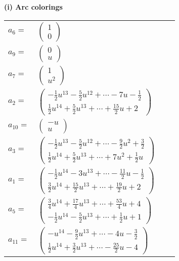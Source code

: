 \documentclass[1p]{elsarticle_modified}
\theoremstyle{definition}
\begin{document}
\flushleft \textbf{(i) Arc colorings}\\
\begin{tabular}{m{7pt} m{180pt} m{7pt} m{180pt} }
\flushright $a_{6}=$&$\begin{pmatrix}1\\0\end{pmatrix}$ \\
\flushright $a_{9}=$&$\begin{pmatrix}0\\u\end{pmatrix}$ \\
\flushright $a_{7}=$&$\begin{pmatrix}1\\u^2\end{pmatrix}$ \\
\flushright $a_{2}=$&$\begin{pmatrix}-\frac{1}{2} u^{13}-\frac{5}{2} u^{12}+\cdots-7 u-\frac{1}{2}\\\frac{1}{2} u^{14}+\frac{5}{2} u^{13}+\cdots+\frac{15}{2} u+2\end{pmatrix}$ \\
\flushright $a_{10}=$&$\begin{pmatrix}- u\\u\end{pmatrix}$ \\
\flushright $a_{3}=$&$\begin{pmatrix}-\frac{1}{2} u^{13}-\frac{5}{2} u^{12}+\cdots-\frac{9}{2} u^2+\frac{3}{2}\\\frac{1}{2} u^{14}+\frac{5}{2} u^{13}+\cdots+7 u^2+\frac{1}{2} u\end{pmatrix}$ \\
\flushright $a_{1}=$&$\begin{pmatrix}-\frac{1}{2} u^{14}-3 u^{13}+\cdots-\frac{11}{2} u-\frac{1}{2}\\\frac{3}{2} u^{14}+\frac{15}{2} u^{13}+\cdots+\frac{19}{2} u+2\end{pmatrix}$ \\
\flushright $a_{5}=$&$\begin{pmatrix}\frac{3}{4} u^{14}+\frac{17}{4} u^{13}+\cdots+\frac{53}{4} u+4\\-\frac{1}{2} u^{14}-\frac{5}{2} u^{13}+\cdots+\frac{1}{2} u+1\end{pmatrix}$ \\
\flushright $a_{11}=$&$\begin{pmatrix}- u^{14}-\frac{9}{2} u^{13}+\cdots-4 u-\frac{3}{2}\\\frac{1}{2} u^{14}+\frac{3}{2} u^{13}+\cdots-\frac{25}{2} u-4\end{pmatrix}$ \\

\end{tabular}
\end{document}
